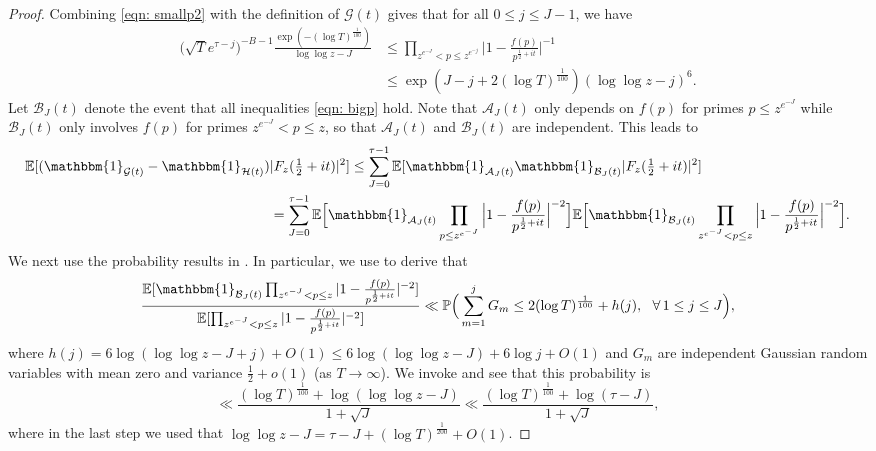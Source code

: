 \documentclass[12pt, notitlepage]{amsart}
\numberwithin{equation}{section}
\def\P{\mathbb P}
\def\E{\mathbb E}
\theoremstyle{remark}
\theoremstyle{definition}
\theoremstyle{remark}
\numberwithin{equation}{section}
\begin{document}
\begin{proof}
   Combining \eqref{eqn: smallp2} with the definition of $\mathcal{G}(t)$ gives that for all $0\le  j \le J-1$, we have 
   \begin{align}\label{eqn: bigp}
 \Big(  \sqrt{T}e^{\tau-j}\Big)^{-B-1}  \frac{\exp(- (\log  T)^{\frac 1{100}}) }{\log \log z -J} 
 &\le \prod_{z^{e^{-J}} <p \le z^{e^{-j}} } \Big |1-\frac{f(p)}{p^{\frac 12+ it}}\Big|^{-1} \nonumber  \\
 & \le \exp(J-j+2 (\log T)^{\frac 1{100}}) (\log \log z - j)^{6}.
   \end{align}
 Let ${\mathcal B}_J(t)$ denote the event that all inequalities \eqref{eqn: bigp} hold. Note that ${\mathcal A}_J(t)$ only depends on $f(p)$ for primes $p\le z^{e^{-J}}$ while ${\mathcal B}_J(t)$ only involves $f(p)$ for primes $z^{e^{-J}} < p\le z$, so that ${\mathcal A}_J(t)$ and ${\mathcal B}_J(t)$ are independent. 
This leads to 
\begin{align*}
\E[(\mathbbm{1}_{\mathcal{G}(t)}-\mathbbm{1}_{\mathcal{H}(t)}) &|F_z(\tfrac 12+it)|^{2}] \le \sum_{J=0}^{\tau-1}\E[\mathbbm{1}_{\mathcal{A}_J(t)}\mathbbm{1}_{\mathcal{B}_J(t)}|F_z(\tfrac 12+it)|^{2} ]  \\ 
& = \sum_{J=0}^{\tau-1}\E\Big[\mathbbm{1}_{\mathcal{A}_J(t)} \prod_{p\le z^{e^{-J}}} \Big|1-\frac{f(p)}{p^{\frac 12+it}}\Big|^{-2}\Big] \E\Big[\mathbbm{1}_{\mathcal{B}_J(t)} \prod_{ z^{e^{-J}}<p \le z} \Big|1-\frac{f(p)}{p^{\frac 12+it}}\Big|^{-2}\Big].
\end{align*}
We next use the probability results in \cite{HarperLow}. In particular, we use \cite[Lemma 4]{HarperLow} to derive that 
\[\frac{\E[\mathbbm{1}_{\mathcal{B}_J(t)} \prod_{ z^{e^{-J}}<p \le z} |1-\frac{f(p)}{p^{\frac 12+it}}|^{-2}]}{\E[ \prod_{ z^{e^{-J}}<p \le z} |1-\frac{f(p)}{p^{\frac 12+it}}|^{-2}]} \ll \P \Big ( \sum_{m=1}^{j}G_m \le  2 (\log T)^{\frac 1{100}} + h(j),~~\forall \, 1\le j \le J  \Big),   \]
where $h(j) = 6\log (\log \log z -J+ j) +O(1)\le 6 \log (\log \log z - J) +6\log j +O(1)$
 and $G_m$ are independent Gaussian random variables with mean zero and variance $\frac 12+o(1)$ (as $T \rightarrow \infty$). We invoke \cite[Probability Result 1]{HarperLow} and see that this probability is 
  \begin{equation}\label{eqn: prob1}
 \ll  \frac{(\log T)^{\frac 1{100}}  + \log (\log \log z - J) }{1+\sqrt{J}} \ll  \frac{(\log T)^{\frac 1{100}} + \log (\tau - J) }{1+\sqrt{J}}  ,     
 \end{equation}
 where in the last step we used that $\log \log z - J = \tau - J + (\log T)^{\frac 1{200}} + O(1)$.  
 

\end{proof}
\end{document}
